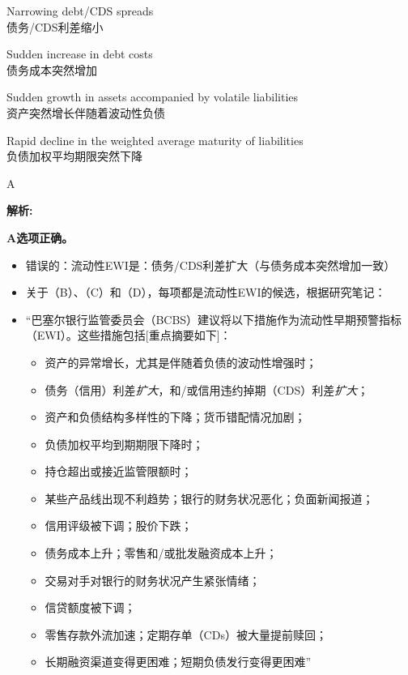 \documentclass{article}
\newenvironment{explanation}
{\textbf{解析:}\par}
{\par}
\begin{document}
  \begin{choices}
      \item Narrowing debt/CDS spreads\\
      债务/CDS利差缩小
      \item Sudden increase in debt costs\\
      债务成本突然增加
      \item Sudden growth in assets accompanied by volatile liabilities\\
      资产突然增长伴随着波动性负债
      \item Rapid decline in the weighted average maturity of liabilities\\
      负债加权平均期限突然下降
  \end{choices}
  
  \begin{correctanswer}
      A
  \end{correctanswer}
  
  \begin{explanation}
      \textbf{A选项正确。} 
      \begin{itemize}
      \item 错误的：流动性EWI是：债务/CDS利差扩大（与债务成本突然增加一致）
      \item 关于（B）、（C）和（D），每项都是流动性EWI的候选，根据研究笔记：
      \item ``巴塞尔银行监管委员会（BCBS）建议将以下措施作为流动性早期预警指标（EWI）。这些措施包括[重点摘要如下]：
      \begin{itemize}
          \item 资产的异常增长，尤其是伴随着负债的波动性增强时；
          \item 债务（信用）利差\textit{扩大}，和/或信用违约掉期（CDS）利差\textit{扩大}；
          \item 资产和负债结构多样性的下降；货币错配情况加剧；
          \item 负债加权平均到期期限下降时；
          \item 持仓超出或接近监管限额时；
          \item 某些产品线出现不利趋势；银行的财务状况恶化；负面新闻报道；
          \item 信用评级被下调；股价下跌；
          \item 债务成本上升；零售和/或批发融资成本上升；
          \item 交易对手对银行的财务状况产生紧张情绪；
          \item 信贷额度被下调；
          \item 零售存款外流加速；定期存单（CDs）被大量提前赎回；
          \item 长期融资渠道变得更困难；短期负债发行变得更困难''
      \end{itemize}
      \end{itemize}
  \end{explanation}
  
\end{document}
